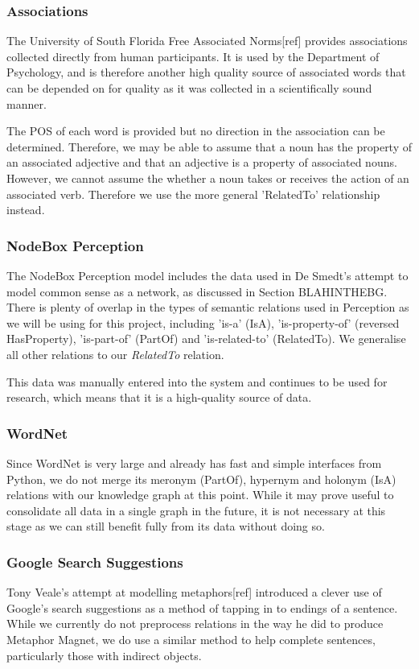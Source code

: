 \subsubsection{Associations}
The University of South Florida Free Associated Norms[ref] provides associations collected directly from human participants. It is used by the Department of Psychology, and is therefore another high quality source of associated words that can be depended on for quality as it was collected in a scientifically sound manner.

The POS of each word is provided but no direction in the association can be determined. Therefore, we may be able to assume that a noun has the property of an associated adjective and that an adjective is a property of associated nouns. However, we cannot assume the whether a noun takes or receives the action of an associated verb. Therefore we use the more general 'RelatedTo' relationship instead.

\subsubsection{NodeBox Perception}
The NodeBox Perception model includes the data used in De Smedt's attempt to model common sense as a network, as discussed in Section BLAHINTHEBG. There is plenty of overlap in the types of semantic relations used in Perception as we will be using for this project, including 'is-a' (IsA), 'is-property-of' (reversed HasProperty), 'is-part-of' (PartOf) and 'is-related-to' (RelatedTo). We generalise all other relations to our \textit{RelatedTo} relation.

This data was manually entered into the system and continues to be used for research, which means that it is a high-quality source of data.

\subsubsection{WordNet}
Since WordNet is very large and already has fast and simple interfaces from Python, we do not merge its meronym (PartOf), hypernym and holonym (IsA) relations with our knowledge graph at this point. While it may prove useful to consolidate all data in a single graph in the future, it is not necessary at this stage as we can still benefit fully from its data without doing so.


\subsubsection{Google Search Suggestions}
Tony Veale's attempt at modelling metaphors[ref] introduced a clever use of Google's search suggestions as a method of tapping in to endings of a sentence. While we currently do not preprocess relations in the way he did to produce Metaphor Magnet, we do use a similar method to help complete sentences, particularly those with indirect objects. 

